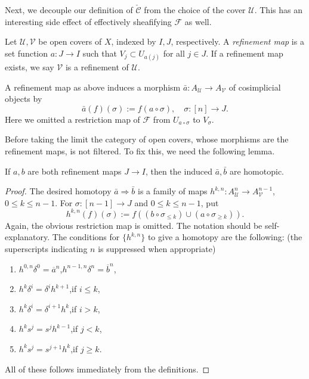 \documentclass{article}
\newcommand{\cC}{\check{\mathcal{C}}}
\begin{document}
Next, we decouple our definition of $\cC$ from the choice of the cover $\mathcal{U}$. This has an interesting side effect of effectively sheafifying $\mathcal{F}$ as well.

\begin{definition}
    Let $\mathcal{U,V}$ be open covers of $X$, indexed by $I,J$, respectively. A \emph{refinement map} is a set function $a:J\to I$ such that $V_{j}\subset U_{a(j)}$ for all $j\in J$. If a refinement map exists, we say $\mathcal{V}$ is a refinement of $\mathcal{U}$.
\end{definition}

A refinement map as above induces a morphism $\bar a:A_{\mathcal{U}}\to A_{\mathcal{V}}$ of cosimplicial objects by
\[
    \bar a(f)(\sigma) := f(a\circ\sigma),\quad \sigma:[n]\to J.
\]
Here we omitted a restriction map of $\mathcal{F}$ from $U_{a\circ\sigma}$ to $V_{\sigma}$.

Before taking the limit the category of open covers, whose morphisms are the refinement maps, is not filtered. To fix this, we need the following lemma.

\begin{lemma}
    If $a,b$ are both refinement maps $J\to I$, then the induced $\bar{a},\bar{b}$ are homotopic.
\end{lemma}

\begin{proof}
    The desired homotopy $\bar{a}\Rightarrow\bar{b}$ is a family of maps $h^{k,n}:A_{\mathcal{U}}^n \to A_{\mathcal{V}}^{n-1}$, $0\leq k\leq n-1$. For $\sigma:[n-1]\to J$ and $0\leq k\leq n-1$, put
    \[
        h^{k,n}(f)(\sigma) := f((b\circ\sigma_{\leq k})\cup (a\circ\sigma_{\geq k})).
    \]
    Again, the obvious restriction map is omitted. The notation should be self-explanatory.
    The conditions for $\{h^{k,n}\}$ to give a homotopy are the following: (the superscripts indicating $n$ is suppressed when appropriate)
    \begin{enumerate}[label=\arabic*), itemsep=3pt]
        \item $h^{0,n}\delta^0=\overline{a}^n$,\quad $h^{n-1,n}\delta^n=\overline{b}^n$,
        \item $h^{k}\delta^{i}=\delta^{i}h^{k+1}$,\quad if $i\leq k$,
        \item $h^{k}\delta^{i}=\delta^{i+1}h^{k}$,\quad if $i>k$,
        \item $h^{k}s^{j}=s^{j}h^{k-1}$,\quad if $j<k$,
        \item $h^{k}s^{j}=s^{j+1}h^{k}$,\quad if $j\geq k$.
    \end{enumerate}
    All of these follows immediately from the definitions.
\end{proof}
\end{document}
